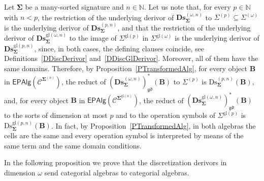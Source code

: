 \documentclass[a4paper, reqno
]{amsart}
\newcommand{\sig}[1]{\mathbf{#1}}             %
\newcommand{\spec}[1]{\boldsymbol{\mathcal{#1}}} %
\newcommand{\gd}{\mathfrak{gd}}              %
\newcommand{\gl}{\mathrm{gl}}                %
\newcommand{\Ds}{\mathrm{Ds}}
\newcommand{\bDs}{\mathbf{Ds}}
\theoremstyle{plain}
\theoremstyle{definition}
\begin{document}
Let $\sig{\Sigma}$ be a many-sorted signature and $n\in\mathbb{N}$.
Let us note that, for every $p\in\mathbb{N}$ with $n<p$, the restriction of the underlying derivor of $\bDs^{(\omega,n)}_{\sig{\Sigma}}$ to $\Sigma^{(p)}\subseteq\Sigma^{(\omega)}$ is the underlying derivor of $\bDs^{(p,n)}_{\sig{\Sigma}}$, and that the restriction of the underlying derivor of $\bDs^{\gl(\omega,n)}_{\sig{\Sigma}}$ to the image of $\Sigma^{\gl(p)}$ in $\Sigma^{\gl(\omega)}$ is the underlying derivor of $\bDs^{\gl(p,n)}_{\sig{\Sigma}}$, since, in both cases, the defining clauses coincide, see Definitions~\ref{DDiscDerivor} and~\ref{DDiscGlDerivor}.
Moreover, all of them have the same domains.
Therefore, by Proposition~\ref{PTransformedAlg}, for every object $\mathbf{B}$ in $\mathsf{EPAlg}(\spec{C}^{\sig{\Sigma}^{(n)}})$, the reduct of $(\bDs^{(\omega,n)}_{\sig{\Sigma}})^{\ast}_{\gd}(\mathbf{B})$ to $\Sigma^{(p)}$ is $\Ds^{(p,n)}_{\sig{\Sigma}}(\mathbf{B})$, and, for every object $\mathbf{B}$ in $\mathsf{EPAlg}(\spec{C}^{\sig{\Sigma}^{\gl(n)}})$, the reduct of $(\bDs^{\gl(\omega,n)}_{\sig{\Sigma}})^{\ast}_{\gd}(\mathbf{B})$ to the sorts of dimension at most $p$ and to the operation symbols of $\Sigma^{\gl(p)}$ is $\Ds^{\gl(p,n)}_{\sig{\Sigma}}(\mathbf{B})$.
In fact, by Proposition~\ref{PTransformedAlg}, in both algebras the cells are the same and every operation symbol is interpreted by means of the same term and the same domain conditions.

In the following proposition we prove that the discretization derivors in dimension $\omega$ send categorial algebras to categorial algebras.
\end{document}
